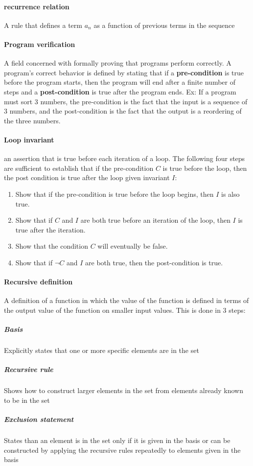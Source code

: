 \documentclass[a4paper]{article}
\begin{document}
\paragraph{recurrence relation} A rule that defines a term $a_n$ as a function of previous terms in the sequence

\paragraph{Program verification} A field concerned with formally proving that programs perform correctly. A program's correct behavior is defined by stating that if a \textbf{pre-condition} is true before the program starts, then the program will end after a finite number of steps and a \textbf{post-condition} is true after the program ends. Ex: If a program must sort 3 numbers, the pre-condition is the fact that the input is a sequence of 3 numbers, and the post-condition is the fact that the output is a reordering of the three numbers.
\paragraph{Loop invariant} an assertion that is true before each iteration of a loop. The following four steps are sufficient to establish that if the pre-condition $C$ is true before the loop, then the post condition is true after the loop given invariant $I$:
\begin{enumerate}
  \item Show that if the pre-condition is true before the loop begins, then $I$ is also true.
  \item Show that if $C$ and $I$ are both true before an iteration of the loop, then $I$ is true after the iteration.
  \item Show that the condition $C$ will eventually be false.
  \item Show that if $\lnot C$ and $I$ are both true, then the post-condition is true.
\end{enumerate}
\paragraph{Recursive definition} A definition of a function in which the value of the function is defined in terms of the output value of the function on smaller input values. This is done in 3 steps:
\subparagraph{Basis} Explicitly states that one or more specific elements are in the set
\subparagraph{Recursive rule} Shows how to construct larger elements in the set from elements already known to be in the set
\subparagraph{Exclusion statement} States than an element is in the set only if it is given in the basis or can be constructed by applying the recursive rules repeatedly to elements given in the basis
\end{document}
